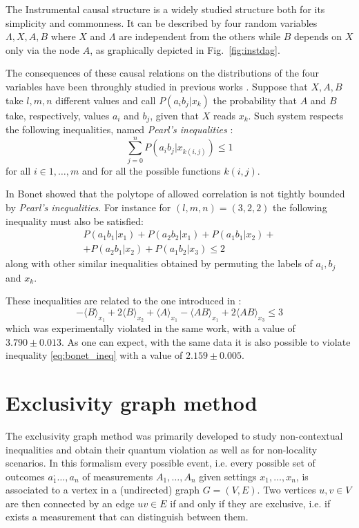 \documentclass[
    nofootinbin,
    floatfix,
    amsfonts,
    twocolumn, 
    aps, 
    prl]{revtex4-1}
\newcommand{\avg}[1]{\langle#1\rangle}
\begin{document}
The Instrumental causal structure is a widely studied
structure both for its simplicity and commonness.
It can be described by four random variables $\Lambda, X, A, B$ where $X$ and
$\Lambda$ are independent from the others while $B$ depends on $X$ only via the node $A$,
as graphically depicted in Fig.~\ref{fig:instdag}.

The consequences of these causal relations on the distributions of the four
variables have been throughly studied in previous works \cite{pearl1995,
bonet2001}.
Suppose that $X, A, B$ take $l,m,n$ different values and 
call $P(a_i b_j | x_k)$ the probability that $A$ and $B$ take, respectively, values $a_i$
and $b_j$, given that $X$ reads $x_k$.
Such system respects the following inequalities,
named \emph{Pearl's inequalities} \cite{pearl1995}:
\begin{equation} 
    \sum_{j=0}^{n} P(a_i b_j|x_{k(i,j)}) \le 1
    \label{eq:pearl_ineq}
\end{equation}
for all $i \in {1,\ldots, m}$ and for all the possible functions $k(i,j)$.

In \cite{bonet2001} Bonet showed that the polytope of allowed
correlation is not tightly bounded by \emph{Pearl's inequalities}.
For instance for $(l,m,n) = (3,2,2)$ the following inequality must also be satisfied:
\begin{multline}
    P(a_1 b_1 | x_1) + P(a_2 b_2 | x_1) + 
    P(a_1 b_1 | x_2) +\\+ P(a_2 b_1 | x_2) + 
    P(a_1 b_2 | x_3) \le 2
    \label{eq:bonet_ineq}
\end{multline}
along with other similar inequalities obtained by permuting the labels of
$a_i,b_j$ and $x_k$.


These inequalities are related to the one introduced in \cite{chaves2018}:
\begin{equation}
    -\avg{B}_{x_1} + 2 \avg{B}_{x_2} + \avg{A}_{x_1} - \avg{AB}_{x_1} +
    2\avg{AB}_{x_3} \le 3  
    \label{eq:rafael_ineq}
\end{equation}
which was experimentally violated in the same work, with a value of $3.790 \pm 0.013$.
As one can expect, with the same data it is also possible to violate inequality
\eqref{eq:bonet_ineq} with a value of $2.159 \pm 0.005$.

\section*{Exclusivity graph method}

The exclusivity graph method was primarily developed to study
non-contextual inequalities and obtain their quantum violation %
\cite{cabello2014} as well as for non-locality scenarios. %
In this formalism every possible event, i.e. every possible set of outcomes
$a_1^,\ldots, a_n$ of measurements $A_1,\ldots,A_n$ given settings
$x_1,\ldots,x_n$, is associated to a vertex in a (undirected) graph $G = (V, E)$.  
Two vertices $u, v \in V$ are then connected by an edge $uv \in E$ if and only
if they are exclusive, i.e.  if exists a measurement that can distinguish
between them. %
\end{document}
